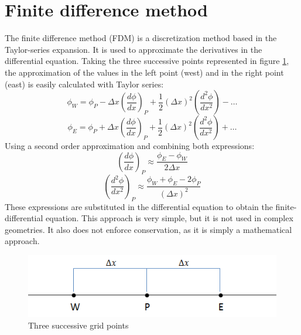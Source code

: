 \section{Finite difference method}
The finite difference method (FDM) is a discretization method based in the Taylor-series expansion. It is used to approximate the derivatives in the differential equation. Taking the three successive points represented in figure \ref{3gridpoints}, the approximation of the values in the left point (west) and in the right point (east) is easily calculated with Taylor series:
\begin{equation}
\phi_{W}=\phi_{P}-\Delta x\left(\frac{d\phi}{dx}\right)_{P}+\frac{1}{2}\left(\Delta x\right)^{2}\left(\frac{d^{2}\phi}{dx^{2}}\right)-\dots
\end{equation}
\begin{equation}
\phi_{E}=\phi_{P}+\Delta x\left(\frac{d\phi}{dx}\right)_{P}+\frac{1}{2}\left(\Delta x\right)^{2}\left(\frac{d^{2}\phi}{dx^{2}}\right)+\dots
\end{equation}
Using a second order approximation and combining both expressions:
\begin{equation}
\left(\frac{d\phi}{dx}\right)_{P}\approx\frac{\phi_{E}-\phi_{W}}{2\Delta x}
\end{equation}
\begin{equation}
\left(\frac{d^{2}\phi}{dx^{2}}\right)_{P}\approx\frac{\phi_{W}+\phi_{E}-2\phi_{P}}{\left(\Delta x\right)^{2}}
\end{equation}
These expressions are substituted in the differential equation to obtain the finite-differential equation. This approach is very simple, but it is not used in complex geometries. It also does not enforce conservation, as it is simply a mathematical approach.
\begin{figure}
	\centering
	\includegraphics[scale=0.8]{StateArt/3gridpoints}
	\caption{Three successive grid points}
	\label{3gridpoints}
\end{figure}

